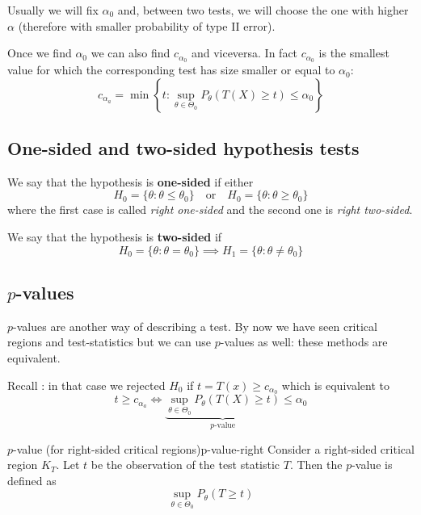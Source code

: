 \documentclass[12pt]{extarticle}
\begin{document}
Usually we will fix $\alpha_0$ and, between two tests, we will choose the one with higher $\alpha$ (therefore with smaller probability of type II error).

Once we find $\alpha_0$ we can also find $c_{\alpha_0}$ and viceversa.
In fact $c_{\alpha_0}$ is the smallest value for which the corresponding test has size smaller or equal to $\alpha_0$:
\begin{equation}
    c_{\alpha_a} = \min \left\{ t : \sup_{\theta \in \Theta_0} P_\theta (T(X)\geq t) \leq \alpha_0 \right\}
    \label{eq:def-c0}
\end{equation}

\subsection{One-sided and two-sided hypothesis tests}

We say that the hypothesis is \textbf{one-sided} if either
\begin{equation}
    H_0 = \{\theta : \theta \leq \theta_0\} \quad \text{or} \quad H_0 = \{\theta : \theta \geq \theta_0\}
\end{equation}
where the first case is called \emph{right one-sided} and the second one is \emph{right two-sided}.

We say that the hypothesis is \textbf{two-sided} if
\begin{equation}
    H_0 = \{ \theta: \theta = \theta_0 \} \implies H_1 = \{ \theta : \theta \ne \theta_0 \}
\end{equation}

\subsection{\texorpdfstring{$p$}{p}-values}

$p$-values are another way of describing a test.
By now we have seen critical regions and test-statistics but we can use $p$-values as well: these methods are equivalent.

Recall : in that case we rejected $H_0$ if $t = T(x) \geq c_{\alpha_0}$ which is equivalent to
\begin{equation}
    t \geq c_{\alpha_a} \iff \underbrace{\sup_{\theta \in \Theta_0} P_\theta (T(X)\geq t)}_{p\text{-value}} \leq \alpha_0
\end{equation}

\begin{definition}{$p$-value (for right-sided critical regions)}{p-value-right}
    Consider a right-sided critical region $K_T$.
    Let $t$ be the observation of the test statistic $T$.
    Then the $p$-value is defined as
    \begin{equation}
        \sup_{\theta \in \Theta_0} P_\theta(T \geq t)
    \end{equation}
\end{definition}
\end{document}
